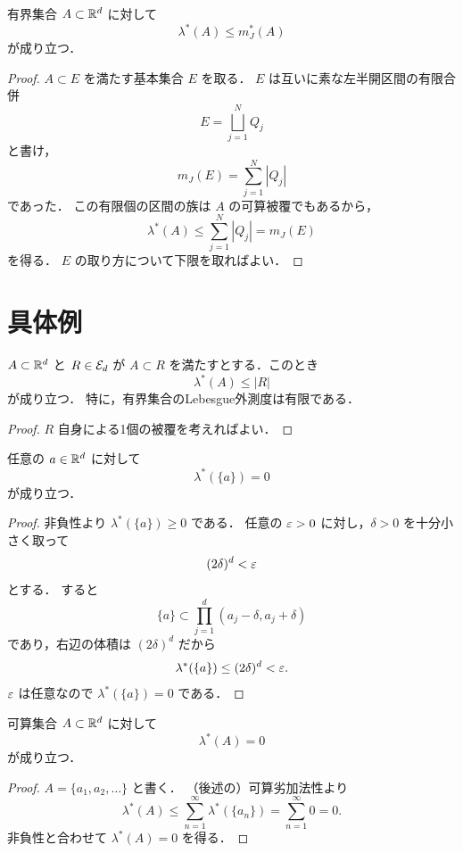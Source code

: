\begin{proposition}[Jordan外測度との比較] \label{prop:louter-le-jouter}
有界集合 $A \subset \mathbb R^d$ に対して
\[
\lambda^*(A) \le m_J^*(A)
\]
が成り立つ．
\end{proposition}
\begin{proof}
$A \subset E$ を満たす基本集合 $E$ を取る．
$E$ は互いに素な左半開区間の有限合併
\[
E = \bigsqcup_{j=1}^N Q_j
\]
と書け，
\[
m_J(E) = \sum_{j=1}^N |Q_j|
\]
であった．
この有限個の区間の族は $A$ の可算被覆でもあるから，
\[
\lambda^*(A) \le \sum_{j=1}^N |Q_j| = m_J(E)
\]
を得る．
$E$ の取り方について下限を取ればよい．
\end{proof}

\section{具体例}

\begin{proposition}[区間による上からの評価]
$A \subset \mathbb R^d$ と $R \in \mathcal E_d$ が
$A \subset R$ を満たすとする．このとき
\[
\lambda^*(A) \le |R|
\]
が成り立つ．
特に，有界集合のLebesgue外測度は有限である．
\end{proposition}
\begin{proof}
$R$ 自身による1個の被覆を考えればよい．
\end{proof}

\begin{proposition}[1点集合は零集合]
任意の $a \in \mathbb R^d$ に対して
\[
\lambda^*(\{a\})=0
\]
が成り立つ．
\end{proposition}
\begin{proof}
非負性より $\lambda^*(\{a\}) \ge 0$ である．
任意の $\varepsilon > 0$ に対し，$\delta > 0$ を十分小さく取って
\[
(2\delta)^d < \varepsilon
\]
とする．
すると
\[
\{a\}
\subset
\prod_{j=1}^d (a_j-\delta,a_j+\delta)
\]
であり，右辺の体積は $(2\delta)^d$ だから
\[
\lambda^*(\{a\}) \le (2\delta)^d < \varepsilon.
\]
$\varepsilon$ は任意なので $\lambda^*(\{a\})=0$ である．
\end{proof}

\begin{theorem}[可算集合は零集合] \label{thm:countable-outer-measure-zero}
可算集合 $A \subset \mathbb R^d$ に対して
\[
\lambda^*(A)=0
\]
が成り立つ．
\end{theorem}
\begin{proof}
$A=\{a_1,a_2,\dots\}$ と書く．
（後述の）可算劣加法性より
\[
\lambda^*(A)
\le
\sum_{n=1}^{\infty} \lambda^*(\{a_n\})
=
\sum_{n=1}^{\infty} 0
=0.
\]
非負性と合わせて $\lambda^*(A)=0$ を得る．
\end{proof}

